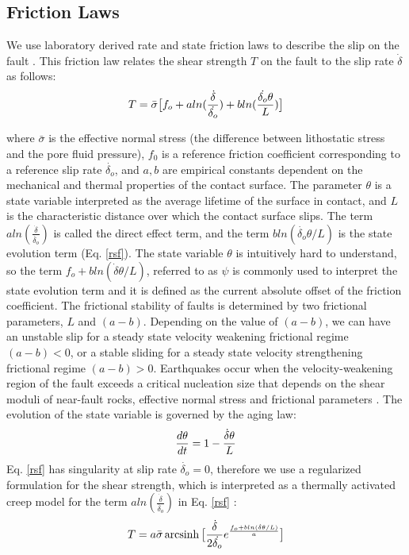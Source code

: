 \documentclass[11pt]{article}
\DeclareMathOperator{\arcsinh}{arcsinh}
\newcommand{\yihe}[1]{{\color{red}#1}}
\begin{document}
\subsection{Friction Laws}
We use laboratory derived rate and state friction laws to describe the slip on the fault \citep{dieterich_1979, ruina_1983, scholz_1998}. This friction law relates the shear strength $T$ on the fault to the slip rate $\dot{\delta}$ as follows:
\begin{align}
    \centering
    T = \bar{\sigma}\big[f_o + aln(\frac{\dot{\delta}}{\dot{\delta_o}}) + bln(\frac{\dot{\delta_o}\theta}{L}) \big]
    \label{rsf}
\end{align}

where $\bar{\sigma}$ is the effective normal stress (the difference between lithostatic stress and the pore fluid pressure), $f_0$ is a reference friction coefficient corresponding to a reference slip rate $\dot{\delta_o}$, and $a, b$ are empirical constants dependent on the mechanical and thermal properties of the contact surface. The parameter $\theta$ is a state variable interpreted as the average lifetime of the surface in contact, and $L$ is the characteristic distance over which the contact surface slips. \yihe{The term $aln(\frac{\dot{\delta}}{\dot{\delta_o}})$ is called the direct effect term, and the term $bln(\dot{\delta_o} \theta/L)$ is the state evolution term (Eq. \ref{rsf}). The state variable $\theta$ is intuitively hard to understand, so the term $f_o+bln(\dot{\delta}\theta/L)$, referred to as $\psi$ is commonly used to interpret the state evolution term and it is defined as the current absolute offset of the friction coefficient.} The frictional stability of faults is determined by two frictional parameters, $L$ and $(a-b)$. Depending on the value of $(a-b)$, we can have an unstable slip for a steady state velocity weakening frictional regime $(a-b)<0$, or a stable sliding for a steady state velocity strengthening frictional regime $(a-b)>0$. Earthquakes occur when the velocity-weakening region of the fault exceeds a critical nucleation size that depends on the shear moduli of near-fault rocks, effective normal stress and frictional parameters \citep{rice_1993, rubin_ampuero_2005}. The evolution of the state variable is governed by the aging law:
\begin{align}
    \centering
    \frac{d\theta}{dt} = 1 - \frac{\dot{\delta}\theta}{L}
    \label{rsf_evolution}
\end{align}
Eq. \ref{rsf} has singularity at slip rate $\dot{\delta_o} =0$, therefore we use a regularized formulation for the shear strength, which is interpreted as a thermally activated creep model for the term $aln(\frac{\dot{\delta}}{\dot{\delta_o}})$ in Eq. \ref{rsf} \citep{rice_benzion_1996, lapusta_2000}:
\begin{align}
    \centering
    T = a\bar{\sigma}\arcsinh\big[\frac{\dot{\delta}}{2\dot{\delta_o}}e^{\frac{f_o + bln(\dot{\delta}\theta/L)}{a}} \big]
\end{align}
\end{document}
